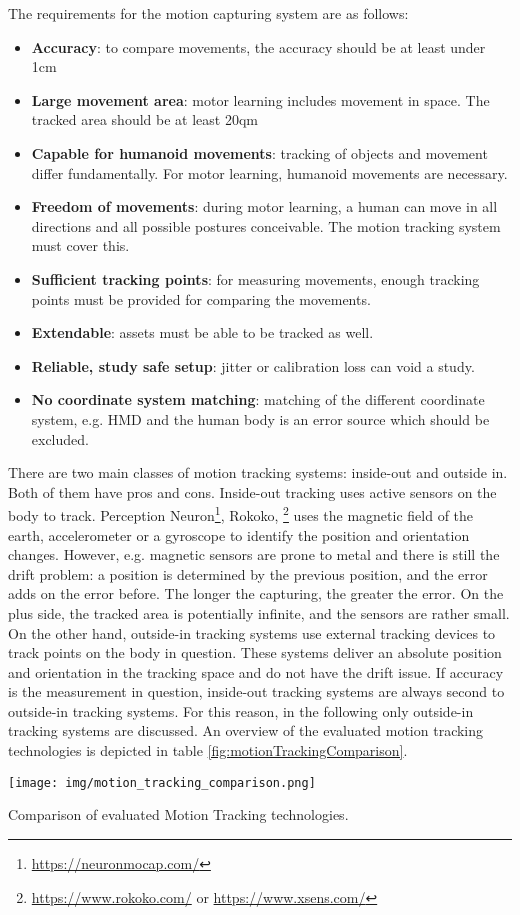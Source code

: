 The requirements for the motion capturing system are as follows: 
\begin{itemize}
	\item \textbf{Accuracy}: to compare movements, the accuracy should be at least under 1cm
	\item \textbf{Large movement area}: motor learning includes movement in space. The tracked area should be at least 20qm
	\item \textbf{Capable for humanoid movements}: tracking of objects and movement differ fundamentally. For motor learning, humanoid movements are necessary.
	\item \textbf{Freedom of movements}: during motor learning, a human can move in all directions and all possible postures conceivable. The motion tracking system must cover this.
	\item \textbf{Sufficient tracking points}: for measuring movements, enough tracking points must be provided for comparing the movements.
	\item \textbf{Extendable}: assets must be able to be tracked as well.
	\item \textbf{Reliable, study safe setup}: jitter or calibration loss can void a study.
	\item \textbf{No coordinate system matching}: matching of the different coordinate system, e.g. HMD and the human body is an error source which should be excluded.
\end{itemize}
There are two main classes of motion tracking systems: inside-out and outside in. Both of them have pros and cons. Inside-out tracking uses active sensors on the body to track. Perception Neuron\footnote{\href{https://neuronmocap.com/}{https://neuronmocap.com/}}, Rokoko, \footnote{\href{https://www.rokoko.com/}{https://www.rokoko.com/} or \href{https://www.xsens.com/}{https://www.xsens.com/}} uses the magnetic field of the earth, accelerometer or a gyroscope to identify the position and orientation changes. However, e.g. magnetic sensors are prone to metal and there is still the drift problem: a position is determined by the previous position, and the error adds on the error before. The longer the capturing, the greater the error. On the plus side, the tracked area is potentially infinite, and the sensors are rather small. On the other hand, outside-in tracking systems use external tracking devices to track points on the body in question. These systems deliver an absolute position and orientation in the tracking space and do not have the drift issue. If accuracy is the measurement in question, inside-out tracking systems are always second to outside-in tracking systems. For this reason, in the following only outside-in tracking systems are discussed. An overview of the evaluated motion tracking technologies is depicted in table \ref{fig:motionTrackingComparison}.
\begin{table}
	\centering
	\texttt{[image: img/motion\_tracking\_comparison.png]}
	\caption{Comparison of evaluated Motion Tracking technologies.}
	\label{fig:motionTrackingComparison}
\end{table}

